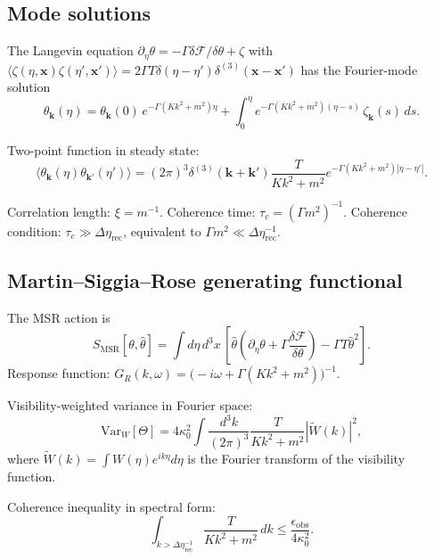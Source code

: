 \documentclass[12pt]{article}
\theoremstyle{definition}
\newcommand{\Wrec}{\Delta\eta_{\mathrm{rec}}}
\newcommand{\VarW}{\mathrm{Var}_W}
\begin{document}
\subsection{Mode solutions}

The Langevin equation $\partial_\eta\theta=-\Gamma\delta\mathcal{F}/\delta\theta+\zeta$
with $\langle\zeta(\eta,\mathbf{x})\zeta(\eta',\mathbf{x}')\rangle
=2\Gamma T\delta(\eta-\eta')\delta^{(3)}(\mathbf{x}-\mathbf{x}')$
has the Fourier-mode solution \cite{Hohenberg1977}
\begin{equation}
  \theta_{\mathbf{k}}(\eta)
  = \theta_{\mathbf{k}}(0)\,e^{-\Gamma(Kk^2+m^2)\eta}
  + \int_0^\eta e^{-\Gamma(Kk^2+m^2)(\eta-s)}\,\zeta_{\mathbf{k}}(s)\,ds.
\end{equation}

Two-point function in steady state:
\begin{equation}
  \langle\theta_{\mathbf{k}}(\eta)\theta_{\mathbf{k}'}(\eta')\rangle
  = (2\pi)^3\delta^{(3)}(\mathbf{k}+\mathbf{k}')
    \frac{T}{Kk^2+m^2}
    e^{-\Gamma(Kk^2+m^2)|\eta-\eta'|}.
\end{equation}

Correlation length: $\xi=m^{-1}$.
Coherence time: $\tau_c=(\Gamma m^2)^{-1}$.
Coherence condition: $\tau_c\gg\Wrec$, equivalent to
$\Gamma m^2\ll\Wrec^{-1}$.

\subsection{Martin--Siggia--Rose generating functional}

The MSR action is \cite{Seifert2012}
\begin{equation}
  S_{\mathrm{MSR}}[\theta,\hat\theta]
  = \int d\eta\,d^3x\,
    \left[
      \hat\theta\!\left(\partial_\eta\theta+\Gamma\frac{\delta\mathcal{F}}{\delta\theta}\right)
      - \Gamma T\hat\theta^2
    \right].
\end{equation}
Response function:
$G_R(k,\omega)=\bigl(-i\omega+\Gamma(Kk^2+m^2)\bigr)^{-1}$.

Visibility-weighted variance in Fourier space:
\begin{equation}
  \VarW[\Theta]
  = 4\kappa_0^2
    \int\frac{d^3k}{(2\pi)^3}
    \frac{T}{Kk^2+m^2}
    |\widetilde{W}(k)|^2,
\end{equation}
where $\widetilde{W}(k)=\int W(\eta)e^{ik\eta}d\eta$
is the Fourier transform of the visibility function.

Coherence inequality in spectral form:
\begin{equation}
  \int_{k>\Wrec^{-1}}\frac{T}{Kk^2+m^2}\,dk
  \leq\frac{\epsilon_{\mathrm{obs}}}{4\kappa_0^2}.
\end{equation}
\end{document}
